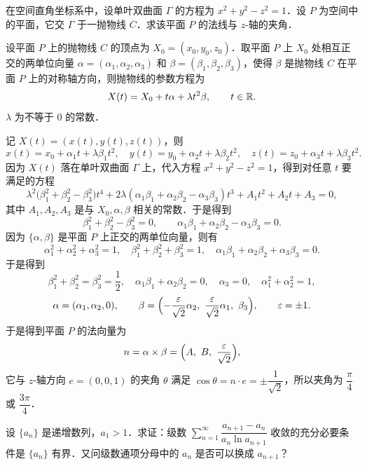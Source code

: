 
在空间直角坐标系中，设单叶双曲面 $\Gamma$ 的方程为 $x^2+y^2-z^2=1$．设 $P$ 为空间中的平面，它交 $\Gamma$ 于一抛物线 $C$．求该平面 $P$ 的法线与 $z$-轴的夹角．

\begin{solution}
设平面 $P$ 上的抛物线 $C$ 的顶点为 $X_0=(x_0,y_0,z_0)$．取平面 $P$ 上 $X_0$ 处相互正交的两单位向量 $\alpha=(\alpha_1,\alpha_2,\alpha_3)$ 和 $\beta=(\beta_1,\beta_2,\beta_3)$，使得 $\beta$ 是抛物线 $C$ 在平面 $P$ 上的对称轴方向，则抛物线的参数方程为
\[
  X(t)=X_0+t\alpha+\lambda t^2\beta,\qquad t\in\mathbb{R} .
\]
$\lambda$ 为不等于 $0$ 的常数．

记 $X(t)=(x(t),y(t),z(t))$，则
\[
  x(t)=x_0+\alpha_1t+\lambda\beta_1t^2,\quad
  y(t)=y_0+\alpha_2t+\lambda\beta_2t^2,\quad
  z(t)=z_0+\alpha_3t+\lambda\beta_3t^2 .
\]
因为 $X(t)$ 落在单叶双曲面 $\Gamma$ 上，代入方程 $x^2+y^2-z^2=1$，得到对任意 $t$ 要满足的方程
\[
  \lambda^2\bigl(\beta_1^2+\beta_2^2-\beta_3^2\bigr)t^4
  +2\lambda(\alpha_1\beta_1+\alpha_2\beta_2-\alpha_3\beta_3)t^3
  +A_1t^2+A_2t+A_3=0,
\]
其中 $A_1,A_2,A_3$ 是与 $X_0,\alpha,\beta$ 相关的常数．于是得到
\[
  \beta_1^2+\beta_2^2-\beta_3^2=0,\qquad
  \alpha_1\beta_1+\alpha_2\beta_2-\alpha_3\beta_3=0 .
\]
因为 $\{\alpha,\beta\}$ 是平面 $P$ 上正交的两单位向量，则有
\[
  \alpha_1^2+\alpha_2^2+\alpha_3^2=1,\quad
  \beta_1^2+\beta_2^2+\beta_3^2=1,\quad
  \alpha_1\beta_1+\alpha_2\beta_2+\alpha_3\beta_3=0 .
\]
于是得到
\[
  \beta_1^2+\beta_2^2=\beta_3^2=\frac12,\quad
  \alpha_1\beta_1+\alpha_2\beta_2=0,\quad
  \alpha_3=0,\quad
  \alpha_1^2+\alpha_2^2=1,
\]
\[
  \alpha=(\alpha_1,\alpha_2,0),\qquad
  \beta=\Bigl(-\frac{\varepsilon}{\sqrt2}\alpha_2,\ \frac{\varepsilon}{\sqrt2}\alpha_1,\ \beta_3\Bigr),\qquad
  \varepsilon=\pm1 .
\]
于是得到平面 $P$ 的法向量为
\[
  n=\alpha\times\beta=\Bigl(A,\ B,\ \frac{\varepsilon}{\sqrt2}\Bigr),
\]
它与 $z$-轴方向 $e=(0,0,1)$ 的夹角 $\theta$ 满足 $\cos\theta=n\cdot e=\pm\dfrac{1}{\sqrt2}$，所以夹角为 $\dfrac{\pi}{4}$ 或 $\dfrac{3\pi}{4}$．
\end{solution}

设 $\{a_n\}$ 是递增数列，$a_1>1$．求证：级数 $\sum_{n=1}^{\infty}\dfrac{a_{n+1}-a_n}{a_n\ln a_{n+1}}$ 收敛的充分必要条件是 $\{a_n\}$ 有界．又问级数通项分母中的 $a_n$ 是否可以换成 $a_{n+1}$？

